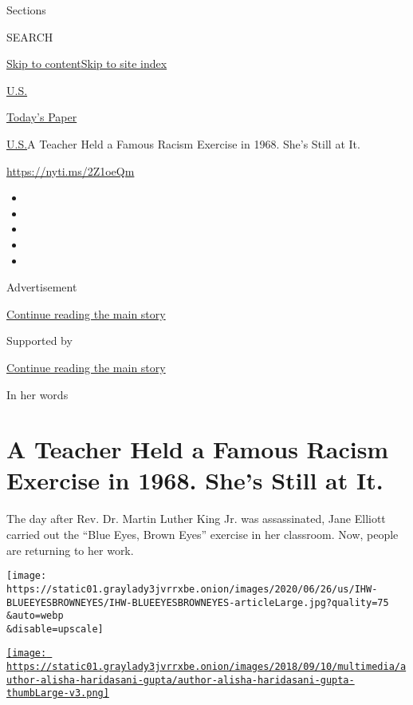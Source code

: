 Sections

SEARCH

\protect\hyperlink{site-content}{Skip to
content}\protect\hyperlink{site-index}{Skip to site index}

\href{https://www.nytimes3xbfgragh.onion/section/us}{U.S.}

\href{https://myaccount.nytimes3xbfgragh.onion/auth/login?response_type=cookie\&client_id=vi}{}

\href{https://www.nytimes3xbfgragh.onion/section/todayspaper}{Today's
Paper}

\href{/section/us}{U.S.}\textbar{}A Teacher Held a Famous Racism
Exercise in 1968. She's Still at It.

\url{https://nyti.ms/2Z1oeQm}

\begin{itemize}
\item
\item
\item
\item
\item
\end{itemize}

Advertisement

\protect\hyperlink{after-top}{Continue reading the main story}

Supported by

\protect\hyperlink{after-sponsor}{Continue reading the main story}

In her words

\hypertarget{a-teacher-held-a-famous-racism-exercise-in-1968-shes-still-at-it}{%
\section{A Teacher Held a Famous Racism Exercise in 1968. She's Still at
It.}\label{a-teacher-held-a-famous-racism-exercise-in-1968-shes-still-at-it}}

The day after Rev. Dr. Martin Luther King Jr. was assassinated, Jane
Elliott carried out the ``Blue Eyes, Brown Eyes'' exercise in her
classroom. Now, people are returning to her work.

\texttt{[image: https://static01.graylady3jvrrxbe.onion/images/2020/06/26/us/IHW-BLUEEYESBROWNEYES/IHW-BLUEEYESBROWNEYES-articleLarge.jpg?quality=75\\\&auto=webp\\\&disable=upscale]}

\href{https://www.nytimes3xbfgragh.onion/by/alisha-haridasani-gupta}{\texttt{[image: https://static01.graylady3jvrrxbe.onion/images/2018/09/10/multimedia/author-alisha-haridasani-gupta/author-alisha-haridasani-gupta-thumbLarge-v3.png]}}

